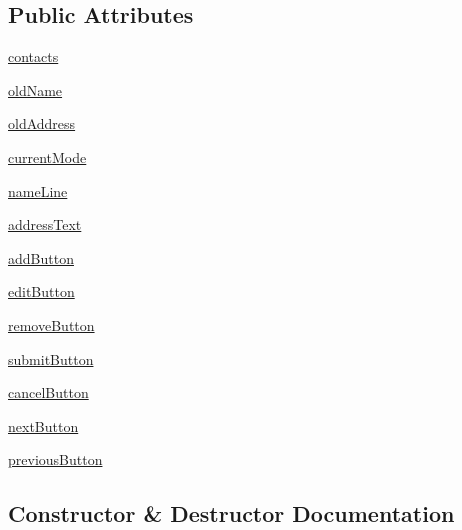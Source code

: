 \subsection*{Public Attributes}
\begin{DoxyCompactItemize}
\item 
\hyperlink{classpart4_1_1AddressBook_aa46986971dbeba045a99d792387a9e15}{contacts}
\item 
\hyperlink{classpart4_1_1AddressBook_a571b0cde15387644bac1715a95616290}{old\+Name}
\item 
\hyperlink{classpart4_1_1AddressBook_a790df6a8fb2688afa7542c7efe00d59f}{old\+Address}
\item 
\hyperlink{classpart4_1_1AddressBook_a287e7ab3636bcade47f641931790c334}{current\+Mode}
\item 
\hyperlink{classpart4_1_1AddressBook_a245dbdbea1fd301019468e2e1f08a3e5}{name\+Line}
\item 
\hyperlink{classpart4_1_1AddressBook_afd28197f22b95b6d6a20ffd8d631699d}{address\+Text}
\item 
\hyperlink{classpart4_1_1AddressBook_a81fd3c80ea358418034673845d0e246a}{add\+Button}
\item 
\hyperlink{classpart4_1_1AddressBook_a09bc8b76438fe2df41cd160a287a2c56}{edit\+Button}
\item 
\hyperlink{classpart4_1_1AddressBook_a58e7547874fff0612c096e10d1116641}{remove\+Button}
\item 
\hyperlink{classpart4_1_1AddressBook_a8f3dabaca0a5417170b48e183fd09cbd}{submit\+Button}
\item 
\hyperlink{classpart4_1_1AddressBook_a95f8421136bb54af0265223b920c082c}{cancel\+Button}
\item 
\hyperlink{classpart4_1_1AddressBook_a69641fcece60458a594ed2811787b214}{next\+Button}
\item 
\hyperlink{classpart4_1_1AddressBook_ada27c5db659ef15bed52599e39f5c704}{previous\+Button}
\end{DoxyCompactItemize}


\subsection{Constructor \& Destructor Documentation}
\hypertarget{classpart4_1_1AddressBook_a4193302df5a7c4c7201e1a83e8c5ce73}{}
